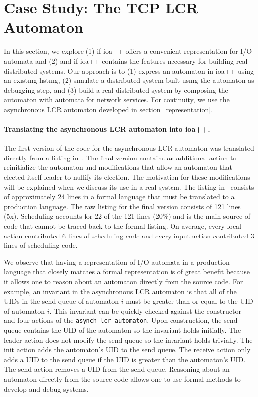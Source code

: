 \section{Case Study:  The TCP LCR Automaton\label{case_study}}

In this section, we explore (1) if ioa++ offers a convenient representation for I/O automata and (2) and if ioa++ contains the features necessary for building real distributed systems.
Our approach is to (1) express an automaton in ioa++ using an existing listing, (2) simulate a distributed system built using the automaton as debugging step, and (3) build a real distributed system by composing the automaton with automata for network services.
For continuity, we use the asynchronous LCR automaton developed in section~\ref{representation}.

\paragraph{Translating the asynchronous LCR automaton into ioa++.}
The first version of the code for the asynchronous LCR automaton was translated directly from a listing in~\cite{lynch1996distributed}.
The final version contains an additional action to reinitialize the automaton and modifications that allow an automaton that elected itself leader to nullify its election.
The motivation for these modifications will be explained when we discuss its use in a real system.
The listing in~\cite{lynch1996distributed} consists of approximately 24 lines in a formal language that must be translated to a production language.
The raw listing for the final version consists of 121 lines (5x).
Scheduling accounts for 22 of the 121 lines (20\%) and is the main source of code that cannot be traced back to the formal listing.
On average, every local action contributed 6 lines of scheduling code and every input action contributed 3 lines of scheduling code.

We observe that having a representation of I/O automata in a production language that closely matches a formal representation is of great benefit because it allows one to reason about an automaton directly from the source code.
For example, an invariant in the asynchronous LCR automaton is that all of the UIDs in the send queue of automaton $i$ must be greater than or equal to the UID of automaton $i$.
This invariant can be quickly checked against the constructor and four actions of the \verb+asynch_lcr_automaton+.
Upon construction, the send queue contains the UID of the automaton so the invariant holds initially.
The leader action does not modify the send queue so the invariant holds trivially.
The init action adds the automaton's UID to the send queue.
The receive action only adds a UID to the send queue if the UID is greater than the automaton's UID.
The send action removes a UID from the send queue.
Reasoning about an automaton directly from the source code allows one to use formal methods to develop and debug systems.

